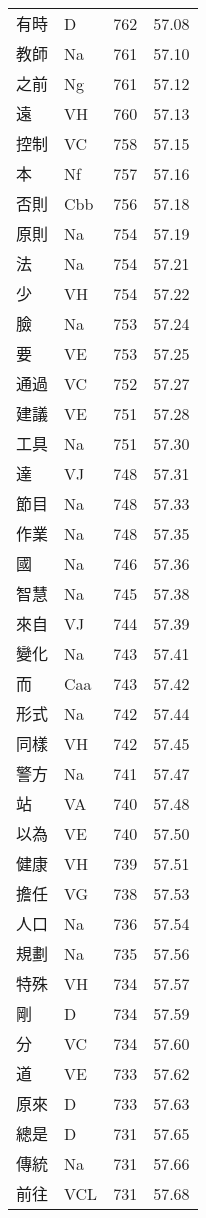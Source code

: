 \documentclass[twocolumn]{book}
\begin{document}
\begin{supertabular}{llrr}
有時 & D & 762 &  57.08\\
教師 & Na & 761 &  57.10\\
之前 & Ng & 761 &  57.12\\
遠 & VH & 760 &  57.13\\
控制 & VC & 758 &  57.15\\
本 & Nf & 757 &  57.16\\
否則 & Cbb & 756 &  57.18\\
原則 & Na & 754 &  57.19\\
法 & Na & 754 &  57.21\\
少 & VH & 754 &  57.22\\
臉 & Na & 753 &  57.24\\
要 & VE & 753 &  57.25\\
通過 & VC & 752 &  57.27\\
建議 & VE & 751 &  57.28\\
工具 & Na & 751 &  57.30\\
達 & VJ & 748 &  57.31\\
節目 & Na & 748 &  57.33\\
作業 & Na & 748 &  57.35\\
國 & Na & 746 &  57.36\\
智慧 & Na & 745 &  57.38\\
來自 & VJ & 744 &  57.39\\
變化 & Na & 743 &  57.41\\
而 & Caa & 743 &  57.42\\
形式 & Na & 742 &  57.44\\
同樣 & VH & 742 &  57.45\\
警方 & Na & 741 &  57.47\\
站 & VA & 740 &  57.48\\
以為 & VE & 740 &  57.50\\
健康 & VH & 739 &  57.51\\
擔任 & VG & 738 &  57.53\\
人口 & Na & 736 &  57.54\\
規劃 & Na & 735 &  57.56\\
特殊 & VH & 734 &  57.57\\
剛 & D & 734 &  57.59\\
分 & VC & 734 &  57.60\\
道 & VE & 733 &  57.62\\
原來 & D & 733 &  57.63\\
總是 & D & 731 &  57.65\\
傳統 & Na & 731 &  57.66\\
前往 & VCL & 731 &  57.68\\

\end{supertabular}
\end{document}
